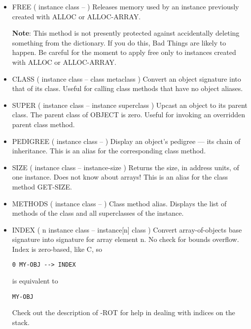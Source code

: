 \begin{;stlisting}[frame=single]
\begin{itemize}[noitemsep]
	\item FREE ( instance class -- )\newline
	Releases memory used by an instance previously created with
	ALLOC or ALLOC-ARRAY.

	\textbf{Note}: This method is not presently protected against
	accidentally deleting something from the dictionary. If you do
	this, Bad Things are likely to happen. Be careful for the moment
	to apply free only to instances created with ALLOC or ALLOC-ARRAY.

	\item CLASS ( instance class -- class metaclass )\newline
	Convert an object signature into that of its class. Useful for
	calling class methods that have no object aliases.

	\item SUPER ( instance class -- instance superclass )\newline
	Upcast an object to its parent class. The parent class of OBJECT
	is zero. Useful for invoking an overridden parent class method.

	\item PEDIGREE ( instance class -- )\newline
	Display an object's pedigree — its chain of inheritance. This is
	an alias for the corresponding class method.

	\item SIZE ( instance class -- instance-size )\newline
	Returns the size, in address units, of one instance. Does not
	know about arrays! This is an alias for the class method GET-SIZE.

	\item METHODS ( instance class -- )\newline
	Class method alias. Displays the list of methods of the class
	and all superclasses of the instance.

	\item INDEX ( n instance class -- instance[n] class )\newline
	Convert array-of-objects base signature into signature for array
	element n. No check for bounds overflow. Index is zero-based,
	like C, so
\begin{lstlisting}[frame=single]
0 MY-OBJ --> INDEX
\end{lstlisting}
	is equivalent to
\begin{lstlisting}[frame=single]
MY-OBJ
\end{lstlisting}
	Check out the description of -ROT for help in dealing with
	indices on the stack.


\end{itemize}
\end{;stlisting}

